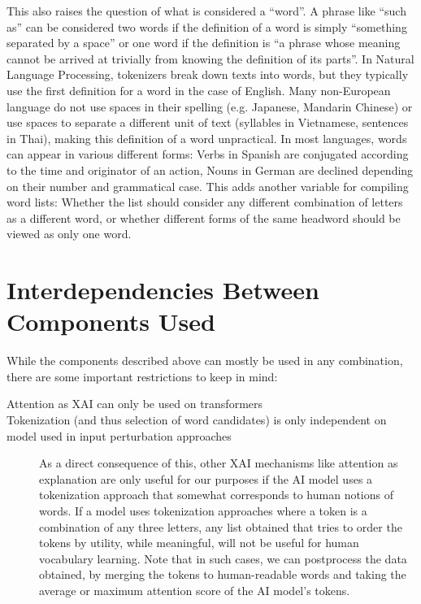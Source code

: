 \begin{description}
	      This also raises the question of what is considered a “word”.
	      A phrase like “such as” can be considered two words if the definition of a word is simply “something separated by a space” or one word if the definition is “a phrase whose meaning cannot be arrived at trivially from knowing the definition of its parts”.
	      In Natural Language Processing, tokenizers break down texts into words, but they typically use the first definition for a word in the case of English.
	      Many non-European language do not use spaces in their spelling (e.g. Japanese, Mandarin Chinese) or use spaces to separate a different unit of text (syllables in Vietnamese, sentences in Thai), making this definition of a word unpractical.
	      In most languages, words can appear in various different forms: Verbs in Spanish are conjugated according to the time and originator of an action, Nouns in German are declined depending on their number and grammatical case.
	      This adds another variable for compiling word lists: Whether the list should consider any different combination of letters as a different word, or whether different forms of the same headword should be viewed as only one word.
\end{description}


\section{Interdependencies Between Components Used}

While the components described above can mostly be used in any combination, there are some important restrictions to keep in mind:

\begin{description}
	\item[Attention as XAI can only be used on transformers]
	\item[Tokenization (and thus selection of word candidates) is only independent on model used in input perturbation approaches]
	      As a direct consequence of this, other XAI mechanisms like attention as explanation are only useful for our purposes if the AI model uses a tokenization approach that somewhat corresponds to human notions of words.
	      If a model uses tokenization approaches where a token is a combination of any three letters, any list obtained that tries to order the tokens by utility, while meaningful, will not be useful for human vocabulary learning.
	      Note that in such cases, we can postprocess the data obtained, by merging the tokens to human-readable words and taking the average or maximum attention score of the AI model's tokens.
	\item[]
\end{description}


